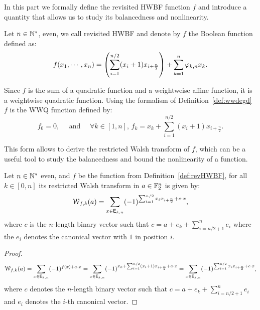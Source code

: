 \documentclass[11pt]{llncs}
\begin{document}
In this part we formally define the revisited HWBF function $f$ and introduce a quantity that allows us to study its balancedness and nonlinearity.

\begin{definition}\label{def:revHWBF}
Let $n\in \mathbb{N}^*$, even, we call revisited HWBF and denote by $f$ the Boolean function defined as:
\[f(x_1,\cdots,x_n)=\left(\sum_{i=1}^{n/2} (x_i+1) x_{i+\frac{n}{2}}\right) + \sum_{k=1}^n \varphi_{k,n} x_k.\]
\end{definition}



Since $f$ is the sum of a quadratic function and a weightweise affine function, it is a weightwise quadratic function. 
Using the formalism of Definition~\ref{def:wwdegd} $f$ is the WWQ function defined by:%
\[f_0=0, \quad \text{ and } \quad \forall k \in [1,n], \, f_k=x_k+\sum_{i=1}^{n/2} (x_i+1) x_{i+\frac{n}{2}}.\]

This form allows to derive the restricted Walsh transform of $f$, which can be a useful tool to study the balancedness and bound the nonlinearity of a function.



\begin{proposition}\label{prop:restrWT}
Let $n \in \mathbb{N}^*$ even, and $f$ be the function from Definition~\ref{def:revHWBF}, for all $k\in [0,n]$ its restricted Walsh transform in $a\in \mathbb{F}_2^n$ is given by:
\[\mathcal{W}_{f,k}(a)=\sum_{x \in \mathsf{E}_{k,n}} (-1)^{\sum_{i=1}^{n/2} x_i x_{i+\frac{n}{2}}+ c \cdot x},\]
where $c$ is the $n$-length binary vector such that $c=a+e_k+\sum_{i=n/2+1}^n e_i$ where the $e_i$ denotes the canonical vector with $1$ in position $i$.
\end{proposition}
\begin{proof}
\[	\mathcal{W}_{f,k}(a)=\sum_{x \in \mathsf{E}_{k,n}} (-1)^{f(x)+a \cdot x}
	=\sum_{x \in \mathsf{E}_{k,n}} (-1)^{x_k + \sum_{i=1}^{n/2} (x_i+1) x_{i+\frac{n}{2}}+ a \cdot x}\\
	=\sum_{x \in \mathsf{E}_{k,n}} (-1)^{\sum_{i=1}^{n/2} x_i x_{i+\frac{n}{2}}+ c \cdot x},\]
where $c$ denotes the $n$-length binary vector such that $c=a+e_k+\sum_{i=n/2+1}^n e_i$ and $e_i$ denotes the $i$-th canonical vector.
\end{proof}
\end{document}
